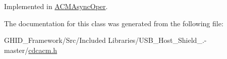 \-Implemented in \hyperlink{class_a_c_m_async_oper_af3e9315952212775f90eb3ccfff168c8}{\-A\-C\-M\-Async\-Oper}.



\-The documentation for this class was generated from the following file\-:\begin{DoxyCompactItemize}
\item 
\-G\-H\-I\-D\-\_\-\-Framework/\-Src/\-Included Libraries/\-U\-S\-B\-\_\-\-Host\-\_\-\-Shield\-\_.-\/master/\hyperlink{cdcacm_8h}{cdcacm.\-h}\end{DoxyCompactItemize}
